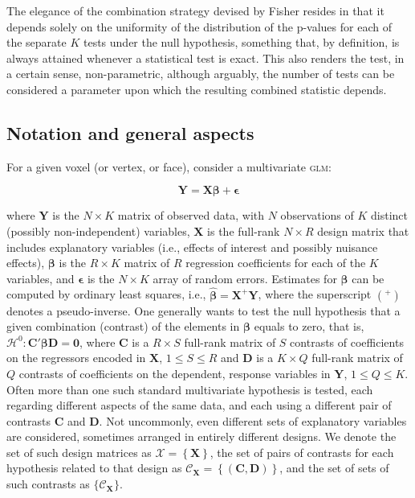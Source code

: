 The elegance of the combination strategy devised by Fisher resides in that it depends solely on the uniformity of the distribution of the p-values for each of the separate $K$ tests under the null hypothesis, something that, by definition, is always attained whenever a statistical test is exact. This also renders the test, in a certain sense, non-parametric, although arguably, the number of tests can be considered a parameter upon which the resulting combined statistic depends.

\subsection{Notation and general aspects}
\label{sec:comb:notation}

For a given voxel (or vertex, or face), consider a multivariate \textsc{glm}:

\begin{equation}
\mathbf{Y} = \mathbf{X}\boldsymbol{\beta} + \boldsymbol{\epsilon}
\label{eqn:comb:glm}
\end{equation}

\noindent
where $\mathbf{Y}$ is the $N \times K$ matrix of observed data, with $N$ observations of $K$ distinct (possibly non-independent) variables, $\mathbf{X}$ is the full-rank $N \times R$ design matrix that includes explanatory variables (i.e., effects of interest and possibly nuisance effects), $\boldsymbol{\beta}$ is the $R \times K$ matrix of $R$ regression coefficients for each of the $K$ variables, and $\boldsymbol{\epsilon}$ is the $N \times K$ array of random errors. Estimates for $\boldsymbol{\beta}$ can be computed by ordinary least squares, i.e., $\boldsymbol{\hat{\beta}} = \mathbf{X}^{+}\mathbf{Y}$, where the superscript $(^{+})$ denotes a pseudo-inverse. One generally wants to test the null hypothesis that a given combination (contrast) of the elements in $\boldsymbol{\beta}$ equals to zero, that is, $\mathcal{H}^{0} : \mathbf{C}'\boldsymbol{\beta}\mathbf{D} = \boldsymbol{0}$, where $\mathbf{C}$ is a $R \times S$ full-rank matrix of $S$ contrasts of coefficients on the regressors encoded in $\mathbf{X}$, $1 \leqslant S \leqslant R$ and $\mathbf{D}$ is a $K \times Q$ full-rank matrix of $Q$ contrasts of coefficients on the dependent, response variables in $\mathbf{Y}$, $1 \leqslant Q \leqslant K$. Often more than one such standard multivariate hypothesis is tested, each regarding different aspects of the same data, and each using a different pair of contrasts $\mathbf{C}$ and $\mathbf{D}$. Not uncommonly, even different sets of explanatory variables are considered, sometimes arranged in entirely different designs. We denote the set of such design matrices as $\mathcal{X} = \left\{\mathbf{X}\right\}$, the set of pairs of contrasts for each hypothesis related to that design as $\mathcal{C}_{\mathbf{X}}=\left\{\left(\mathbf{C},\mathbf{D}\right)\right\}$, and the set of sets of such contrasts as $\{\mathcal{C}_{\mathbf{X}}\}$.

